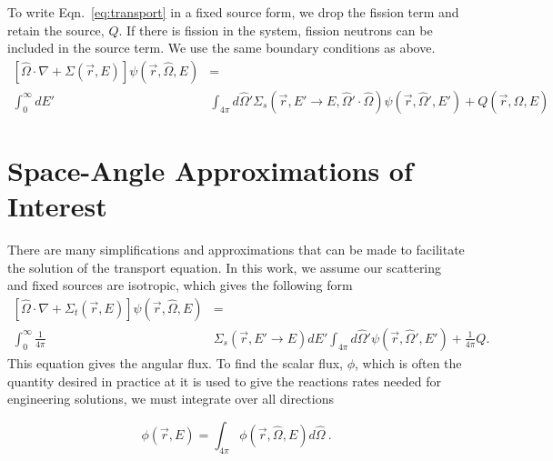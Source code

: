 To write Eqn.~\eqref{eq:transport} in a fixed source form, we drop the fission term and retain the source, $Q$. If there is fission in the system, fission neutrons can be included in the source term. We use the same boundary conditions as above. 
%
\begin{equation}
\begin{split}
 [\hat{\Omega} \cdot \nabla + \Sigma(\vec{r}, E)]\psi(\vec{r}, \hat{\Omega}, E) &= \\ \int_0^\infty dE' &\int_{4\pi} d\hat{\Omega}' \Sigma_s(\vec{r}, E' \rightarrow E, \hat{\Omega}' \cdot \hat{\Omega})\psi(\vec{r}, \hat{\Omega}', E')  + Q(\vec{r}, \hat{\Omega}, E)
\end{split}
 \label{eq:transport_fixed_source}
\end{equation}



\section{Space-Angle Approximations of Interest}
There are many simplifications and approximations that can be made to facilitate the solution of the transport equation. In this work, we assume our scattering and fixed sources are isotropic, which gives the following form
%
\begin{equation}
\begin{split}

[\hat{\Omega} \cdot \nabla + \Sigma_t(\vec{r}, E)]\psi(\vec{r}, \hat{\Omega}, E) &= \\  \int_0^\infty \frac{1}{4\pi} &\Sigma_s(\vec{r}, E' \rightarrow E)  dE' \int_{4\pi} d\hat{\Omega}'\psi(\vec{r}, \hat{\Omega}', E')  + \frac{1}{4\pi}Q.

\end{split}
 \label{eq:transport_isotropic_scattering}
\end{equation}
%
This equation gives the angular flux. To find the scalar flux, $\phi$, which is often the quantity desired in practice at it is used to give the reactions rates needed for engineering solutions, we must integrate over all directions

\begin{equation}
  \phi(\vec{r}, E) = \int_{4\pi} \phi(\vec{r}, \hat{\Omega}, E) d \hat{\Omega}\:.
\end{equation}


